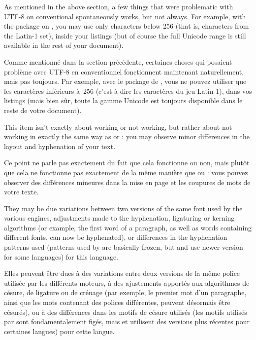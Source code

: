 \documentclass{lltxdoc}
\begin{document}
As mentioned in the above section, a few things that were problematic with
UTF-8 on conventional \latex spontaneously works, but not always. For example,
with the  package on \lualatex, you may use only characters below
256 (that is, characters from the Latin-1 set), inside your listings (but of
course the full Unicode range is still available in the rest of your document).

Comme mentionné dans la section précédente, certaines choses qui posaient problème avec UTF-8 en \latex conventionnel fonctionnent maintenant naturellement, mais pas toujours. Par exemple, avec le package  de \lualatex, vous ne pouvez utiliser que les caractères inférieurs à~256 (c'est-à-dire les caractères du jeu Latin-1), dans vos listings (mais bien sûr, toute la gamme Unicode est toujours disponible dans le reste de votre document).

This item isn't exactly about working or not working, but rather about not
working in exactly the same way as \pdftex or \xetex: you may observe minor
differences in the layout and hyphenation of your text.

Ce point ne parle pas exactement du fait que cela fonctionne ou non, mais plutôt que cela ne fonctionne pas exactement de la même manière que \pdftex ou \xetex: vous pouvez observer des différences mineures dans la mise en page et les coupures de mots de votre texte.

They may be due variations between two versions of the same font used by the
various engines, adjustments made to the hyphenation, ligaturing or kerning
algorithms (or example, the first word of a paragraph, as well as words
containing different fonts, can now be hyphenated), or differences in the
hyphenation patterns used (patterns used by \pdftex are basically frozen, but
\luatex and \xetex use newer version for some languages) for this language.

Elles peuvent être dues à des variations entre deux versions de la même police utilisée par les différents moteurs, à des ajustements apportés aux algorithmes de césure, de ligature ou de crénage (par exemple, le premier mot d'un paragraphe, ainsi que les mots contenant des polices différentes, peuvent désormais être césurés), ou à des différences dans les motifs de césure utilisés (les motifs utilisés par \pdftex sont fondamentalement figés, mais \luatex et \xetex utilisent des versions plus récentes pour certaines langues) pour cette langue.
\end{document}
